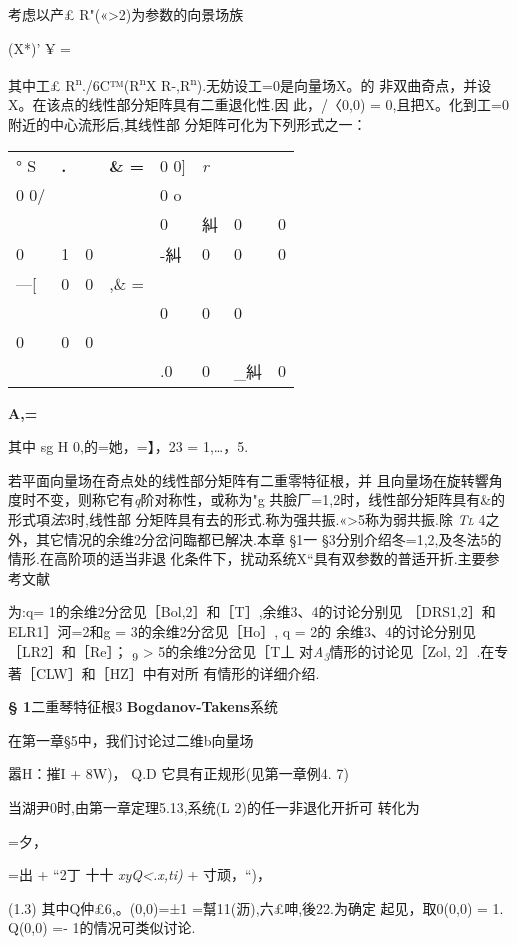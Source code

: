 \documentclass{article}
\begin{document}
考虑以产£ R"(«\textgreater{}2)为参数的向景场族

(X*)' ¥ =

其中工£ R\textsuperscript{n}./6C™(R\textsuperscript{n}X
R-,R\textsuperscript{n}).无妨设工=0是向量场X。的
非双曲奇点，并设X。在该点的线性部分矩阵具有二重退化性.因 此，/〈0,0) =
0,且把X。化到工=0附近的中心流形后,其线性部 分矩阵可化为下列形式之一：

\begin{longtable}[]{@{}llllllll@{}}
\toprule
\endhead
° S & \textbf{.} & & \textbf{\& =} & 0 0{]} & \emph{r} &
&\tabularnewline
0 0/ & & & & 0 o\textbar{} & & &\tabularnewline
& & & & 0 & 糾 & 0 & 0\tabularnewline
0 & 1 & 0 & & -糾 & 0 & 0 & 0\tabularnewline
---{[} & 0 & 0 & ,\& = & & & &\tabularnewline
& & & & 0 & 0 & 0 &\tabularnewline
0 & 0 & 0 & & & & &\tabularnewline
& & & & .0 & 0 & \_糾 & 0\tabularnewline
\bottomrule
\end{longtable}

\textbf{A,=}

其中 sg H 0,的=她，=】，23 = 1,\ldots{}，5.

若平面向量场在奇点处的线性部分矩阵有二重零特征根，并
且向量场在旋转響角度时不变，则称它有\emph{q}阶对称性，或称为"g
共臉厂=1,2时，线性部分矩阵具有\&的形式項\emph{法}3时,线性部
分矩阵具有去的形式.称为强共振.«\textgreater{}5称为弱共振.除
\emph{\textsc{Tl}} 4之外，其它情况的余维2分岔问臨都已解决.本章 §1一
§3分别介绍冬=1,2,及冬法5的情形.在高阶项的适当非退
化条件下，扰动系统X``具有双参数的普适开折.主要参考文献

为:q= 1的余维2分岔见［Bol,2］和［T］,余维3、4的讨论分别见
［DRS1,2］和ELR1］河=2和g = 3的余维2分岔见［Ho］, q = 2的
余维3、4的讨论分别见［LR2］和［Re］； \textsubscript{9} \textgreater{}
5的余维2分岔见［T丄 对\emph{A\textsubscript{3}}情形的讨论见［Zol,
2］.在专著［CLW］和［HZ］中有对所 有情形的详细介绍.

\protect\hypertarget{bookmark126}{}{}\textbf{§ 1}二重琴特征根3
\textbf{Bogdanov-Takens}系统

在第一章§5中，我们讨论过二维b向量场

嚣H：摧I + 8W)， Q.D 它具有正规形(见第一章例4. 7)

当湖尹0时,由第一章定理5.13,系统(L 2)的任一非退化开折可 转化为

=夕，

=出 + ``2丁 十十 \emph{xyQ\textless{}.x,ti)} + 寸顽，``)，

(1.3) 其中Q仲£6,。(0,0)=±1 =幫11(沥),六£呻,後22.为确定 起见，取0(0,0) =
1. Q(0,0) =- 1的情况可类似讨论.
\end{document}
